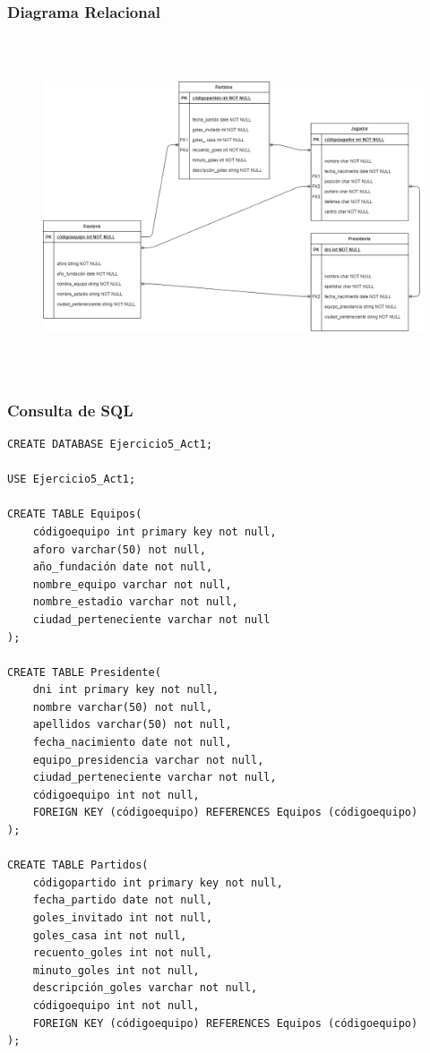 \documentclass[a4paper, 12pt]{article}
\begin{document}
\begin{justify}
        \subsubsection{Diagrama Relacional}
        \begin{figure}[H]
            \centering
            \includegraphics[width=16cm,height=10cm]{rel5.png}
        \end{figure}
        \subsubsection{Consulta de SQL}
\begin{verbatim}
CREATE DATABASE Ejercicio5_Act1;

USE Ejercicio5_Act1;

CREATE TABLE Equipos(
    códigoequipo int primary key not null,
    aforo varchar(50) not null,
    año_fundación date not null,
    nombre_equipo varchar not null,
    nombre_estadio varchar not null,
    ciudad_perteneciente varchar not null
);

CREATE TABLE Presidente(
    dni int primary key not null,
    nombre varchar(50) not null,
    apellidos varchar(50) not null,
    fecha_nacimiento date not null,
    equipo_presidencia varchar not null,
    ciudad_perteneciente varchar not null,
    códigoequipo int not null,
    FOREIGN KEY (códigoequipo) REFERENCES Equipos (códigoequipo)
);

CREATE TABLE Partidos(
	códigopartido int primary key not null,
    fecha_partido date not null,
    goles_invitado int not null,
    goles_casa int not null,
    recuento_goles int not null,
    minuto_goles int not null,
    descripción_goles varchar not null,
    códigoequipo int not null,
    FOREIGN KEY (códigoequipo) REFERENCES Equipos (códigoequipo)
);


\end{verbatim}
\end{justify}
\end{document}
